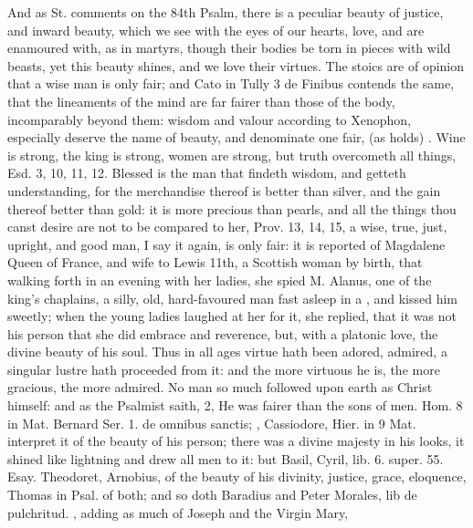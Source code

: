 {And as St. \Austin{} comments on the 84th Psalm, there is a peculiar
beauty of justice, and inward beauty, which we see with the eyes of our
hearts, love, and are enamoured with, as in martyrs, though their
bodies be torn in pieces with wild beasts, yet this beauty shines, and
we love their virtues. The stoics are of opinion that a wise man
is only fair; and Cato in Tully 3 de Finibus contends the same, that
the lineaments of the mind are far fairer than those of the body,
incomparably beyond them: wisdom and valour according to
Xenophon, especially deserve the name of beauty, and denominate
one fair,  (as \Austin{} holds) . Wine is strong, the king is
strong, women are strong, but truth overcometh all things, Esd.  3,
10, 11, 12. Blessed is the man that findeth wisdom, and getteth
understanding, for the merchandise thereof is better than silver, and
the gain thereof better than gold: it is more precious than pearls, and
all the things thou canst desire are not to be compared to her, Prov.
 13, 14, 15, a wise, true, just, upright, and good man, I say it
again, is only fair: it is reported of Magdalene Queen of France,
and wife to Lewis 11th, a Scottish woman by birth, that walking forth
in an evening with her ladies, she spied M. Alanus, one of the king's
chaplains, a silly, old, hard-favoured man fast asleep in a
, and kissed him sweetly; when the young ladies laughed at her for
it, she replied, that it was not his person that she did embrace and
reverence, but, with a platonic love, the divine beauty of his
soul. Thus in all ages virtue hath been adored, admired, a singular
lustre hath proceeded from it: and the more virtuous he is, the more
gracious, the more admired. No man so much followed upon earth as
Christ himself: and as the Psalmist saith,  2, He was fairer than
the sons of men. \Chrysostom{} Hom. 8 in Mat. Bernard Ser. 1. de omnibus
sanctis; \Austin{}, Cassiodore, Hier. in 9 Mat. interpret it of the
beauty of his person; there was a divine majesty in his looks, it
shined like lightning and drew all men to it: but Basil, Cyril, lib. 6.
super. 55. Esay. Theodoret, Arnobius, \etc{} of the beauty of his
divinity, justice, grace, eloquence, \etc{} Thomas in Psal.  of both;
and so doth Baradius and Peter Morales, lib de pulchritud. , adding as much of Joseph and the Virgin Mary, }
